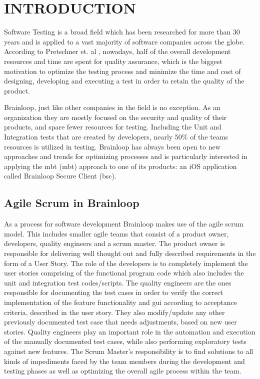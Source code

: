 \chapter{INTRODUCTION}
\label{chapter:introduction}

\par
Software Testing is a broad field which has been researched for more than 30 years and is applied to a vast majority of software companies across the globe. According to Pretschner et. al \cite{Pretschner_MBTInPractice}, nowadays, half of the overall development resources and time are spent for quality assurance, which is the biggest motivation to optimize the testing process and minimize the time and cost of designing, developing and executing a test in order to retain the quality of the product.


\par
Brainloop, just like other companies in the field is no exception. As an organization they are mostly focused on the security and quality of their products, and spare fewer resources for testing. Including the Unit and Integration tests that are created by developers, nearly 50\% of the teams resources is utilized in testing. Brainloop has always been open to new approaches and trends for optimizing processes and is particularly interested in applying the \acrlong{mbt} (\acrshort{mbt}) approach to one of its products: an iOS application called Brainloop Secure Client (\acrshort{bsc}).

\section{Agile Scrum in Brainloop}

\par
As a process for software development Brainloop makes use of the agile scrum \cite{Agile_Scrum} model. This includes smaller agile teams that consist of a product owner, developers, quality engineers and a scrum master. The product owner is responsible for delivering well thought out and fully described requirements in the form of a User Story. The role of the developers is to completely implement the user stories comprising of the functional program code which also includes the unit and integration test codes/scripts. The quality engineers are the ones responsible for documenting the test cases in order to verify the correct implementation of the feature functionality and \acrlong{gui} according to acceptance criteria, described in the user story. They also modify/update any other previously documented test case that needs adjustments, based on new user stories. Quality engineers play an important role in the automation and execution of the manually documented test cases, while also performing exploratory tests against new features. The Scrum Master's responsibility is to find solutions to all kinds of impediments faced by the team members during the development and testing phases as well as optimizing the overall agile process within the team.

